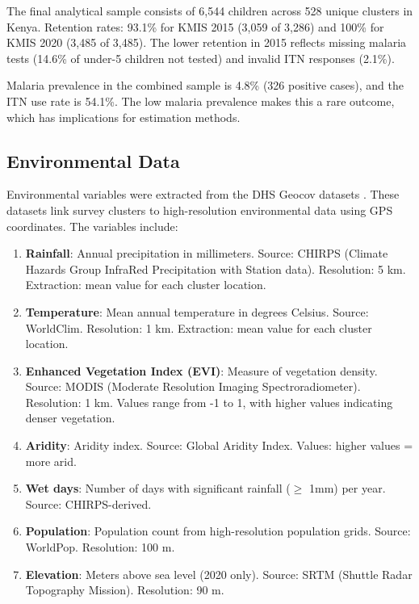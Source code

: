 The final analytical sample consists of 6,544 children across 528 unique clusters in Kenya. Retention rates: 93.1\% for KMIS 2015 (3,059 of 3,286) and 100\% for KMIS 2020 (3,485 of 3,485). The lower retention in 2015 reflects missing malaria tests (14.6\% of under-5 children not tested) and invalid ITN responses (2.1\%).

Malaria prevalence in the combined sample is 4.8\% (326 positive cases), and the ITN use rate is 54.1\%. The low malaria prevalence makes this a rare outcome, which has implications for estimation methods.

\subsection{Environmental Data}

Environmental variables were extracted from the DHS Geocov datasets \citep{dhsgeocov}. These datasets link survey clusters to high-resolution environmental data using GPS coordinates. The variables include:

\begin{enumerate}
	\item \textbf{Rainfall}: Annual precipitation in millimeters. Source: CHIRPS (Climate Hazards Group InfraRed Precipitation with Station data). Resolution: 5 km. Extraction: mean value for each cluster location.
	
	\item \textbf{Temperature}: Mean annual temperature in degrees Celsius. Source: WorldClim. Resolution: 1 km. Extraction: mean value for each cluster location.
	
	\item \textbf{Enhanced Vegetation Index (EVI)}: Measure of vegetation density. Source: MODIS (Moderate Resolution Imaging Spectroradiometer). Resolution: 1 km. Values range from -1 to 1, with higher values indicating denser vegetation.
	
	\item \textbf{Aridity}: Aridity index. Source: Global Aridity Index. Values: higher values = more arid.
	
	\item \textbf{Wet days}: Number of days with significant rainfall ($\geq$ 1mm) per year. Source: CHIRPS-derived.
	
	\item \textbf{Population}: Population count from high-resolution population grids. Source: WorldPop. Resolution: 100 m.
	
	\item \textbf{Elevation}: Meters above sea level (2020 only). Source: SRTM (Shuttle Radar Topography Mission). Resolution: 90 m.
\end{enumerate}

